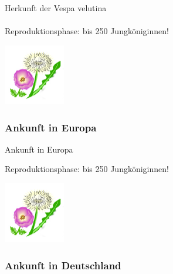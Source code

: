 \documentclass[aspectratio=169]{beamer}
\begin{document}
\begin{frame}{Herkunft der Vespa velutina}
	\framesubtitle{} 

	\begin{examples}{Reproduktionsphase:  }{bis 250 Jungköniginnen!}
		\begin{center}	
			\includegraphics[width=0.2\textwidth]{figures/BH-Logo_Quat.png}
		\end{center}
		\end{examples}
\end{frame}

\subsubsection[Ankunft in Europa]{Ankunft in Europa}

\begin{frame}{Ankunft in Europa}

	\begin{examples}{Reproduktionsphase:  }{bis 250 Jungköniginnen!}
		\begin{center}	
			\includegraphics[width=0.2\textwidth]{figures/BH-Logo_Quat.png}
		\end{center}
		\end{examples}
\end{frame}

\subsubsection[Ankunft in Deutschland]{Ankunft in Deutschland}
\end{document}
